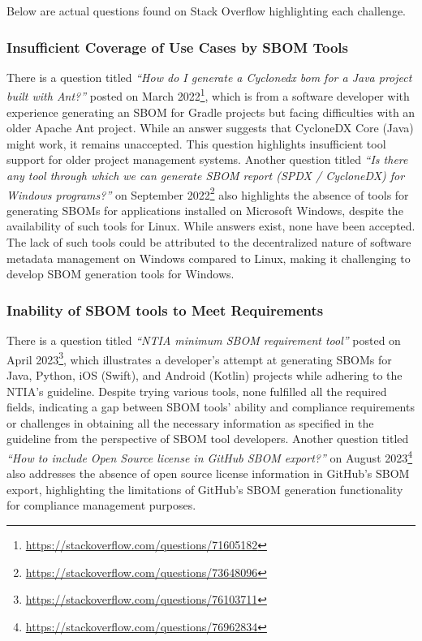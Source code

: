 \documentclass[conference]{IEEEtran}
\begin{document}
Below are actual questions found on Stack Overflow highlighting each challenge.

\subsubsection{Insufficient Coverage of Use Cases by SBOM Tools}
There is a question titled \emph{``How do I generate a Cyclonedx bom for a Java project built with Ant?''} posted on March 2022\footnote{\url{https://stackoverflow.com/questions/71605182}}, which is from a software developer with experience generating an SBOM for Gradle projects but facing difficulties with an older Apache Ant project. While an answer suggests that CycloneDX Core (Java) might work, it remains unaccepted. This question highlights insufficient tool support for older project management systems. Another question titled \emph{``Is there any tool through which we can generate SBOM report (SPDX / CycloneDX) for Windows programs?''} on September 2022\footnote{\url{https://stackoverflow.com/questions/73648096}} also highlights the absence of tools for generating SBOMs for applications installed on Microsoft Windows, despite the availability of such tools for Linux. While answers exist, none have been accepted. The lack of such tools could be attributed to the decentralized nature of software metadata management on Windows compared to Linux, making it challenging to develop SBOM generation tools for Windows.

\subsubsection{Inability of SBOM tools to Meet Requirements}
There is a question titled \emph{``NTIA minimum SBOM requirement tool''} posted on April 2023\footnote{\url{https://stackoverflow.com/questions/76103711}}, which illustrates a developer's attempt at generating SBOMs for Java, Python, iOS (Swift), and Android (Kotlin) projects while adhering to the NTIA's guideline. Despite trying various tools, none fulfilled all the required fields, indicating a gap between SBOM tools' ability and compliance requirements or challenges in obtaining all the necessary information as specified in the guideline from the perspective of SBOM tool developers. Another question titled \emph{``How to include Open Source license in GitHub SBOM export?''} on August 2023\footnote{\url{https://stackoverflow.com/questions/76962834}} also addresses the absence of open source license information in GitHub's SBOM export, highlighting the limitations of GitHub's SBOM generation functionality for compliance management purposes.
\end{document}
